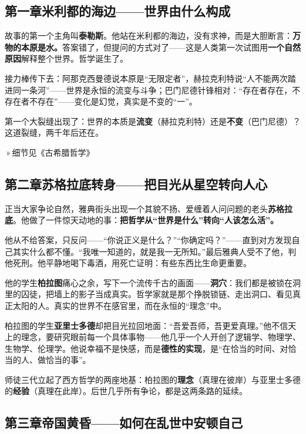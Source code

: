 \documentclass[12pt,a4paper,fontset=none]{ctexart}
\newcommand{\link}[1]{{\par\smallskip\noindent\hspace*{2em}\small\sffamily\color{link}\,»\,#1\par\smallskip}}
\newcommand{\saying}[1]{{\notomed\color{accent}#1}}
\begin{document}
\subsection{第一章\quad 米利都的海边——世界由什么构成}

故事的第一个主角叫\textbf{泰勒斯}。他站在米利都的海边，没有求神，而是大胆断言：\textbf{万物的本原是水。}答案错了，但提问的方式对了——这是人类第一次试图用\textbf{一个自然原因}解释整个世界。哲学诞生了。

接力棒传下去：阿那克西曼德说本原是“无限定者”，赫拉克利特说\saying{“人不能两次踏进同一条河”}——世界是永恒的流变与斗争；巴门尼德针锋相对：\saying{“存在者存在，不存在者不存在”}——变化是幻觉，真实是不变的“一”。

\begin{note}
第一个大裂缝出现了：世界的本质是\textbf{流变}（赫拉克利特）还是\textbf{不变}（巴门尼德）？这道裂缝，两千年后还在。
\end{note}
\link{细节见《古希腊哲学》}

\subsection{第二章\quad 苏格拉底转身——把目光从星空转向人心}

正当大家争论自然，雅典街头出现一个其貌不扬、爱缠着人问问题的老头\textbf{苏格拉底}。他做了一件惊天动地的事：\textbf{把哲学从“世界是什么”转向“人该怎么活”。}

他从不给答案，只反问——“你说正义是什么？”“你确定吗？”——直到对方发现自己其实什么都不懂。\saying{“我唯一知道的，就是我一无所知。”}最后雅典人受不了他，判他死刑。他平静地喝下毒酒，用死亡证明：有些东西比生命更重要。

他的学生\textbf{柏拉图}痛心之余，写下一个流传千古的画面——\textbf{洞穴}：我们都是被锁在洞里的囚徒，把墙上的影子当成真实。哲学家就是那个挣脱锁链、走出洞口、看见真正太阳的人。真实的世界不在感官里，而在永恒的“理念”中。

柏拉图的学生\textbf{亚里士多德}却把目光拉回地面：“吾爱吾师，吾更爱真理。”他不信天上的理念，要研究眼前每一个具体事物——他几乎一个人开创了逻辑学、物理学、生物学、伦理学。他说幸福不是快感，而是\textbf{德性的实现}，是“在恰当的时间、对恰当的人、做恰当的事”。

\begin{note}
师徒三代立起了西方哲学的两座地基：柏拉图的\textbf{理念}（真理在彼岸）与亚里士多德的\textbf{经验}（真理在此岸）。后世几乎所有争论，都是这两条路的延续。
\end{note}

\subsection{第三章\quad 帝国黄昏——如何在乱世中安顿自己}
\end{document}
